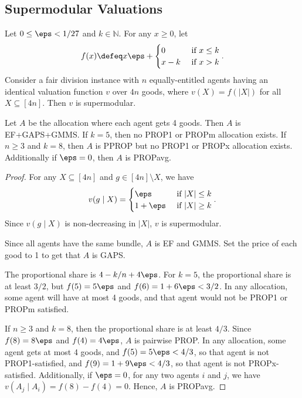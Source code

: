\subsection{Supermodular Valuations}
\label{sec:cex-extra:supmod}

\begin{lemma}
\label{cex:ef-not-prop-supmod}
Let $0 \le \eps < 1/27$ and $k \in \mathbb{N}$. For any $x \ge 0$, let
\[ f(x) \defeq x\eps + \begin{cases}
0 & \textrm{ if } x \le k
\\ x-k & \textrm{ if } x > k
\end{cases}. \]
Consider a fair division instance with $n$ equally-entitled agents
having an identical valuation function $v$ over $4n$ goods,
where $v(X) = f(|X|)$ for all $X \subseteq [4n]$. Then $v$ is supermodular.

Let $A$ be the allocation where each agent gets 4 goods. Then $A$ is EF+GAPS+GMMS.
If $k = 5$, then no PROP1 or PROPm allocation exists.
If $n \ge 3$ and $k = 8$, then $A$ is PPROP but no PROP1 or PROPx allocation exists.
Additionally if $\eps = 0$, then $A$ is PROPavg.
\end{lemma}
\begin{proof}
For any $X \subseteq [4n]$ and $g \in [4n] \setminus X$, we have
\[ v(g \mid X) = \begin{cases}
\eps & \textrm{ if } |X| \le k
\\ 1 + \eps & \textrm{ if } |X| \ge k
\end{cases}. \]
Since $v(g \mid X)$ is non-decreasing in $|X|$, $v$ is supermodular.

Since all agents have the same bundle, $A$ is EF and GMMS.
Set the price of each good to 1 to get that $A$ is GAPS.

The proportional share is $4-k/n+4\eps$.
For $k = 5$, the proportional share is at least $3/2$,
but $f(5) = 5\eps$ and $f(6) = 1+6\eps < 3/2$.
In any allocation, some agent will have at most 4 goods,
and that agent would not be PROP1 or PROPm satisfied.

If $n \ge 3$ and $k = 8$, then the proportional share is at least $4/3$.
Since $f(8) = 8\eps$ and $f(4) = 4\eps$, $A$ is pairwise PROP.
In any allocation, some agent gets at most 4 goods,
and $f(5) = 5\eps < 4/3$, so that agent is not PROP1-satisfied,
and $f(9) = 1 + 9\eps < 4/3$, so that agent is not PROPx-satisfied.
Additionally, if $\eps = 0$, for any two agents $i$ and $j$,
we have $v(A_j \mid A_i) = f(8) - f(4) = 0$. Hence, $A$ is PROPavg.
\end{proof}

